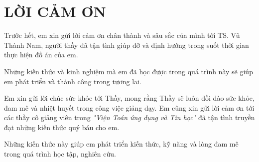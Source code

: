 \chapter*{\centering LỜI CẢM ƠN}


Trước hết, em xin gửi lời cảm ơn chân thành và sâu sắc của mình tới TS. Vũ Thành Nam, người thầy đã tận tình giúp đỡ và định hướng trong suốt thời gian thực hiện đồ án của em. 




Những kiến thức và kinh nghiệm mà em đã học được trong quá trình này sẽ giúp em phát triển và thành công trong tương lai. 



Em xin gửi lời chúc sức khỏe tới Thầy, mong rằng Thầy sẽ luôn dồi dào sức khỏe, đam mê và nhiệt huyết trong công việc giảng dạy.
% 
Em cũng xin gửi lời cảm ơn tới các thầy cô giảng viên trong \emph{"Viện Toán ứng dụng và Tin học"} đã tận tình truyền đạt những kiến thức quý báu cho em. 




Những kiến thức này giúp em phát triển kiến thức, kỹ năng và lòng đam mê trong quá trình học tập, nghiên cứu.











